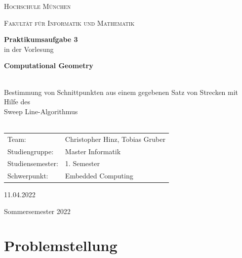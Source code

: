 \documentclass[12pt]{scrartcl}
\begin{document}
\begin{titlepage}
    \vfill
	\centering
    \vspace{1.5cm}

	{\scshape\LARGE Hochschule München \par}
    {\scshape\Large Fakultät für Informatik und Mathematik\par}
	\vspace{1.5cm}




    \vfill
    {\LARGE\bfseries Praktikumsaufgabe 3 \\}
    \vspace{0.5cm}
	{in der Vorlesung\\}
    \vspace{0.5cm}
    {\LARGE\bfseries Computational Geometry\\~\\ \par}
	{\LARGE Bestimmung von Schnittpunkten aus einem gegebenen Satz von Strecken mit Hilfe des \\Sweep Line-Algorithmus\\~\\ \par}
	\vfill
    \vfill


    \begin{tabular}{ll}
    \normalsize
    Team:  & Christopher Hinz, Tobias Gruber\\
    Studiengruppe: & Master Informatik\\
    Studiensemester: & 1. Semester\\
    Schwerpunkt: & Embedded Computing\\
    \end{tabular}
    \vspace{1.5cm}

    11.04.2022

    \vspace{0.5cm}

    Sommersemester 2022

	\vfill

\end{titlepage}

\newpage

\thispagestyle{empty}
\tableofcontents
\newpage

\section{Problemstellung}
\end{document}
